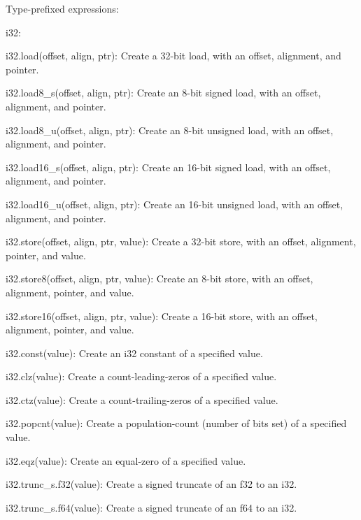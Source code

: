 Type-\/prefixed expressions\+:


\begin{DoxyItemize}
\item {\ttfamily i32}\+:
\begin{DoxyItemize}
\item {\ttfamily i32.\+load(offset, align, ptr)}\+: Create a 32-\/bit load, with an offset, alignment, and pointer.
\item {\ttfamily i32.\+load8\+\_\+s(offset, align, ptr)}\+: Create an 8-\/bit signed load, with an offset, alignment, and pointer.
\item {\ttfamily i32.\+load8\+\_\+u(offset, align, ptr)}\+: Create an 8-\/bit unsigned load, with an offset, alignment, and pointer.
\item {\ttfamily i32.\+load16\+\_\+s(offset, align, ptr)}\+: Create an 16-\/bit signed load, with an offset, alignment, and pointer.
\item {\ttfamily i32.\+load16\+\_\+u(offset, align, ptr)}\+: Create an 16-\/bit unsigned load, with an offset, alignment, and pointer.
\item {\ttfamily i32.\+store(offset, align, ptr, value)}\+: Create a 32-\/bit store, with an offset, alignment, pointer, and value.
\item {\ttfamily i32.\+store8(offset, align, ptr, value)}\+: Create an 8-\/bit store, with an offset, alignment, pointer, and value.
\item {\ttfamily i32.\+store16(offset, align, ptr, value)}\+: Create a 16-\/bit store, with an offset, alignment, pointer, and value.
\item {\ttfamily i32.\+const(value)}\+: Create an {\ttfamily i32} constant of a specified value.
\item {\ttfamily i32.\+clz(value)}\+: Create a count-\/leading-\/zeros of a specified value.
\item {\ttfamily i32.\+ctz(value)}\+: Create a count-\/trailing-\/zeros of a specified value.
\item {\ttfamily i32.\+popcnt(value)}\+: Create a population-\/count (number of bits set) of a specified value.
\item {\ttfamily i32.\+eqz(value)}\+: Create an equal-\/zero of a specified value.
\item {\ttfamily i32.\+trunc\+\_\+s.\+f32(value)}\+: Create a signed truncate of an {\ttfamily f32} to an {\ttfamily i32}.
\item {\ttfamily i32.\+trunc\+\_\+s.\+f64(value)}\+: Create a signed truncate of an {\ttfamily f64} to an {\ttfamily i32}.

\end{DoxyItemize}
\end{DoxyItemize}

